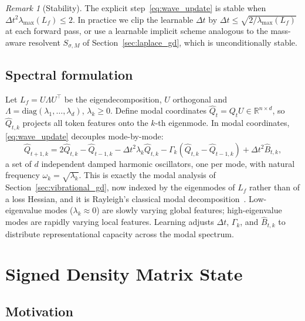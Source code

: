 \documentclass[12pt,a4paper]{article}
\theoremstyle{plain}
\theoremstyle{definition}
\theoremstyle{remark}
\newtheorem{remark}[theorem]{Remark}
\newcommand{\R}{\mathbb{R}}
\newcommand{\diag}{\mathrm{diag}}
\newcommand{\1}{\mathbf{1}}
\begin{document}
\begin{remark}[Stability]
The explicit step~\eqref{eq:wave_update} is stable when
$\Delta t^2 \lambda_{\max}(L_f) \leq 2$. In practice we clip the
learnable $\Delta t$ by $\Delta t \leq \sqrt{2/\lambda_{\max}(L_f)}$ at
each forward pass, or use a learnable implicit scheme analogous to the
mass-aware resolvent $S_{\sigma,M}$ of
Section~\ref{sec:laplace_gd}, which is unconditionally stable.
\end{remark}

\subsection{Spectral formulation}
\label{sec:spectral}

Let $L_f = U \Lambda U^\top$ be the eigendecomposition, $U$ orthogonal
and $\Lambda = \diag(\lambda_1,\dots,\lambda_d)$, $\lambda_k \ge 0$.
Define modal coordinates $\hat{Q}_t = Q_t U \in \R^{n \times d}$, so
$\hat{Q}_{t,k}$ projects all token features onto the $k$-th eigenmode. In
modal coordinates, \eqref{eq:wave_update} decouples mode-by-mode:
\begin{equation}
  \hat{Q}_{t+1,k} = 2\hat{Q}_{t,k} - \hat{Q}_{t-1,k}
    - \Delta t^2 \lambda_k \hat{Q}_{t,k}
    - \Gamma_k (\hat{Q}_{t,k} - \hat{Q}_{t-1,k})
    + \Delta t^2 \hat{B}_{t,k},
  \label{eq:modal_wave}
\end{equation}
a set of $d$ independent damped harmonic oscillators, one per mode, with
natural frequency $\omega_k = \sqrt{\lambda_k}$. This is exactly the
modal analysis of Section~\ref{sec:vibrational_gd}, now indexed by the
eigenmodes of $L_f$ rather than of a loss Hessian, and it is Rayleigh's
classical modal decomposition~\cite{rayleigh_theory_sound_1}.
Low-eigenvalue modes ($\lambda_k \approx 0$) are slowly varying global
features; high-eigenvalue modes are rapidly varying local features.
Learning adjusts $\Delta t$, $\Gamma_k$, and $\hat{B}_{t,k}$ to
distribute representational capacity across the modal spectrum.

\section{Signed Density Matrix State}
\label{sec:density_matrix}

\subsection{Motivation}
\end{document}
